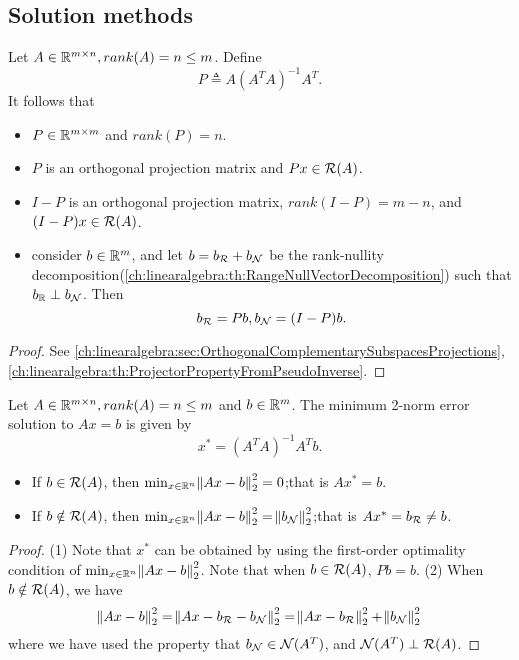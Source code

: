 \begin{refsection}
\subsection{Solution methods}\label{ch:linearalgebra:sec:linearEquationSolutionMethod}
\begin{lemma}
	Let $A\in \mathbb{R}^{m\times n},rank(A) = n\leq m$. Define
	$$P \triangleq  A(A^TA)^{-1}A^T.$$
It follows that 
\begin{itemize}
	\item $P\in \mathbb{R}^{m\times m}$ and $rank(P) = n$.
	\item $P$ is an orthogonal projection matrix and $Px \in \mathcal{R}(A)$.
	\item $I- P$ is an orthogonal projection matrix, $rank(I-P) = m-n$, and $(I-P)x \in \mathcal{R}(A)$.
	\item consider $b\in \mathbb{R}^m$, and let $b = b_{\mathcal{R}} + b_{\mathcal{N}}$ be the rank-nullity decomposition(\autoref{ch:linearalgebra:th:RangeNullVectorDecomposition}) such that $b_{\mathbb{R}} \perp b_{\mathcal{N}}$. Then $$b_{\mathcal{R}} = Pb, b_{\mathcal{N}} = (I-P)b.$$
\end{itemize}
\end{lemma}
\begin{proof}
See \autoref{ch:linearalgebra:sec:OrthogonalComplementarySubspacesProjections},\autoref{ch:linearalgebra:th:ProjectorPropertyFromPseudoInverse}.
\end{proof}



\begin{lemma}\label{ch:linearalgebra:th:linearEquationSolutionMethodTallThinMatrixFullColumnRank}
Let $A\in \mathbb{R}^{m\times n},rank(A) = n\leq m$ and $b\in \mathbb{R}^m$. The minimum 2-norm error solution to $Ax = b$ is given by 
	$$x^* = (A^TA)^{-1}A^Tb.$$
\begin{itemize}
	\item If $b\in \mathcal{R}(A)$, then $\min_{x\in\mathbb{R}^n} \norm{Ax - b}_2^2 = 0$;that is $Ax^* = b$.
	\item If $b\notin \mathcal{R}(A)$, then $\min_{x\in\mathbb{R}^n} \norm{Ax - b}_2^2 = \norm{b_{\mathcal{N}}}_2^2$;that is $Ax^* = b_{\mathcal{R}} \neq b$.
\end{itemize}
\end{lemma}
\begin{proof}
(1) Note that $x^*$ can be obtained by using the first-order optimality condition of $\min_{x\in\mathbb{R}^n} \norm{Ax - b}_2^2$. Note that when $b\in\mathcal{R}(A)$, $Pb = b$.
(2) When $b\notin\mathcal{R}(A)$, we have
$$\norm{Ax - b}_2^2 = \norm{Ax - b_{\mathcal{R}} - b_{\mathcal{N}}}_2^2 = \norm{Ax - b_{\mathcal{R}}}_2^2 + \norm{b_{\mathcal{N}}}_2^2$$
where we have used the property that $b_{\mathcal{N}}\in\mathcal{N}(A^T)$, and
$\mathcal{N}(A^T) \perp \mathcal{R}(A)$.
\end{proof}



\end{refsection}
